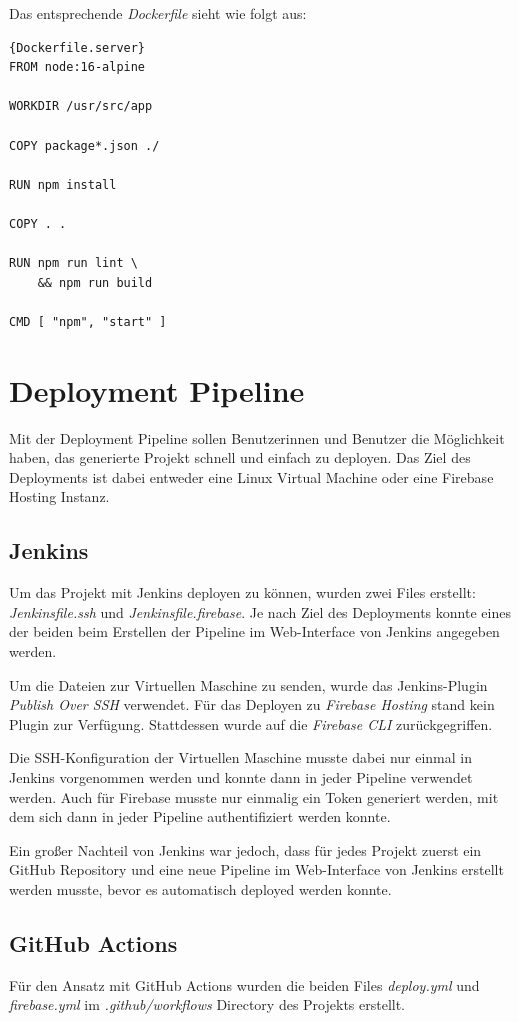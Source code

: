 Das entsprechende \textit{Dockerfile} sieht wie folgt aus:

\begin{lstlisting}[label={lst:Dockerfile.server}]{Dockerfile.server}
FROM node:16-alpine

WORKDIR /usr/src/app

COPY package*.json ./

RUN npm install

COPY . .

RUN npm run lint \
    && npm run build

CMD [ "npm", "start" ]
\end{lstlisting}


\section{Deployment Pipeline}
Mit der Deployment Pipeline sollen Benutzerinnen und Benutzer die Möglichkeit haben, das generierte Projekt schnell
und einfach zu deployen.
Das Ziel des Deployments ist dabei entweder eine Linux Virtual Machine oder eine Firebase Hosting Instanz.

\subsection{Jenkins}
Um das Projekt mit Jenkins deployen zu können, wurden zwei Files erstellt: \textit{Jenkinsfile.ssh} und
\textit{Jenkinsfile.firebase}.
Je nach Ziel des Deployments konnte eines der beiden beim Erstellen der Pipeline im Web-Interface von Jenkins
angegeben werden.

Um die Dateien zur Virtuellen Maschine zu senden, wurde das Jenkins-Plugin \textit{Publish Over SSH}
verwendet.
Für das Deployen zu \textit{Firebase Hosting} stand kein Plugin zur Verfügung.
Stattdessen wurde auf die \textit{Firebase CLI} zurückgegriffen.

Die SSH-Konfiguration der Virtuellen Maschine musste dabei nur einmal in Jenkins vorgenommen werden und konnte
dann in jeder Pipeline verwendet werden.
Auch für Firebase musste nur einmalig ein Token generiert werden, mit dem sich dann in jeder Pipeline
authentifiziert werden konnte.

Ein großer Nachteil von Jenkins war jedoch, dass für jedes Projekt zuerst ein GitHub
Repository und eine neue Pipeline im Web-Interface von Jenkins erstellt werden
musste, bevor es automatisch deployed werden konnte.

\subsection{GitHub Actions}
Für den Ansatz mit GitHub Actions wurden die beiden Files \textit{deploy.yml} und \textit{firebase.yml} im
\textit{.github/workflows} Directory des Projekts erstellt.


